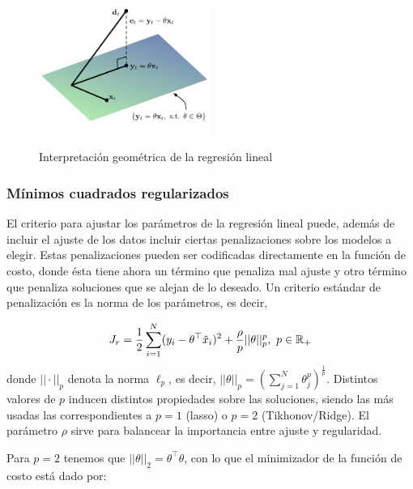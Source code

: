\begin{figure}[ht]
	\centering
	\includegraphics[width=0.5\textwidth]{img/projection.pdf}\\
	\caption{Interpretación geométrica de la regresión lineal}
	\label{fig:projection}
\end{figure}


\subsubsection{Mínimos cuadrados regularizados} %
\label{ssub:min_cuad_reg}

El criterio para ajustar los parámetros de la regresión lineal puede, además de incluir el ajuste de los datos incluir ciertas penalizaciones sobre los modelos a elegir. Estas penalizaciones pueden ser codificadas directamente en la función de costo, donde ésta tiene ahora un término que penaliza mal ajuste y otro término que penaliza soluciones que se alejan de lo deseado. Un criterio estándar de penalización es la norma de los parámetros, es decir, 

\begin{equation}
	J_r = \frac{1}{2}\sum_{i=1}^N(y_i-\theta^
	\top \tilde{x}_i)^2 + \frac{\rho}{p}||\theta||_p^p,\ p\in{\mathbb R}_+
	\label{eq:reg_least_squares}
\end{equation} 
donde $||\cdot||_p$ denota la norma $\ell_p$, es decir, $||\theta||_p=(\sum_{j=1}^N\theta_j^p)^\frac{1}{p}$. Distintos valores de $p$ inducen distintos propiedades sobre las soluciones, siendo las más usadas las correspondientes a $p=1$ (lasso) o $p=2$ (Tikhonov/Ridge). El parámetro $\rho$ sirve para balancear la importancia entre ajuste y regularidad.

 Para $p=2$ tenemos que $||\theta||_2 = \theta^\top\theta$, con lo que el minimizador de la función de costo está dado por: 

